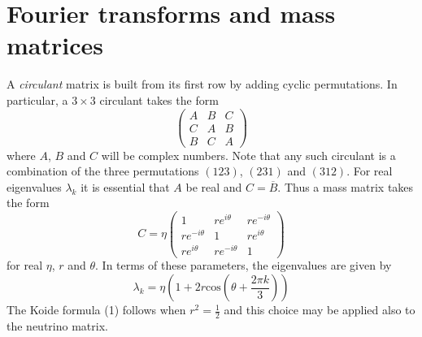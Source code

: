 \documentclass[aps,prl,onecolumn,showpacs,address,11pt]{revtex4}
\begin{document}
\section{Fourier transforms and mass matrices}

A {\em circulant} matrix is built from its first row by adding
cyclic permutations. In particular, a $3 \times 3$ circulant takes
the form \begin{equation} \left( \begin{array}{ccc} A & B & C \\ C & A & B \\
B & C & A \end{array} \right) \end{equation} where $A$, $B$ and
$C$ will be complex numbers. Note that any such circulant is a
combination of the three permutations $(123)$, $(231)$ and
$(312)$. For real eigenvalues $\lambda_k$ it is essential that $A$
be real and $C = \overline{B}$. Thus a mass matrix \cite{Brannen}
takes the form
\begin{equation}\label{BrannenMat} C = \eta
\left( \begin{array}{ccc} 1 & r e^{i \theta}
& r e^{- i \theta} \\ r e^{- i \theta} & 1 & r e^{i \theta} \\ r
e^{i \theta} & r e^{- i \theta} & 1 \end{array} \right)
\end{equation} for real $\eta$, $r$ and $\theta$. In terms of
these parameters, the eigenvalues are given by
\[ \lambda_{k} = \eta (1 + 2r \textrm{cos}(\theta + \frac{2 \pi k}{3}))
\] The Koide formula (1) follows when $r^2 = \frac{1}{2}$ and this
choice may be applied also to the neutrino matrix.
\end{document}
